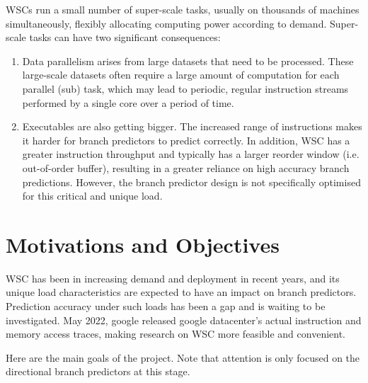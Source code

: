 WSCs run a small number of super-scale tasks, usually on thousands of machines simultaneously, flexibly allocating computing power according to demand. Super-scale tasks can have two significant consequences:
\begin{enumerate}[itemsep= 0pt,topsep = 0pt, partopsep=4 pt, leftmargin= 32 pt]
\item Data parallelism arises from large datasets that need to be processed. These large-scale datasets 
often require a large amount of computation for each parallel (sub) task, which may lead to 
periodic, regular instruction streams performed by a single core over a period of time.
\item Executables are also getting bigger. The increased range of instructions makes it harder for 
branch predictors to predict correctly.
In addition, WSC has a greater instruction throughput and typically has a larger reorder window (i.e. 
out-of-order buffer), resulting in a greater reliance on high accuracy branch predictions. However, the 
branch predictor design is not specifically optimised for this critical and unique load.
\end{enumerate}
\section{Motivations and Objectives} %

WSC has been in increasing demand and deployment in recent years, and its unique load characteristics are expected to have an impact on branch predictors. Prediction accuracy under such loads has been a gap and is waiting to be investigated. May 2022, google released google datacenter's actual instruction and memory access traces, making research on WSC more feasible and convenient. \par\hspace*{\fill}\par

Here are the main goals of the project. Note that attention is only focused on the directional branch predictors at this stage.\par


